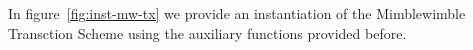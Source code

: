 \begin{center}
    \fbox{
    \begin{varwidth}{\textwidth}
        \procedure[linenumbering]{$\procCreateCoin{\varValue}{\varBlindingFactor}$} {
        \varCoin \opFunResult \procCommit{\varValue}{\varBlindingFactor} \\
        \varProof \opFunResult \procProof{\varCoin}{\varValue}{\varBlindingFactor} \\
        \pcreturn (\varCoin, \varProof)
        }
        \procedure[linenumbering]{$\procCreatePreTx{\varMsg}{\funArray{\varCoinInp}}{\funArray{\varCoinOut}}{\funArray{\varProof}}{\varSigContext}{\funArray{\varCommitment}}{\varSignature}$}{
        \pcreturn ( \\
        \varMsg \opAssign \varMsg, \\
        \varInputs \opAssign \funArray{\varCoinInp}, \\
        \varOutputs \opAssign \funArray{\varCoinOut}, \\
        \varProofs \opAssign \funArray{\varProof}, \\
        \varSigContext \opAssign \varSigContext, \\
        \varCommits \opAssign \funArray{\varCommitment}, \\
        \varSignature \opAssign \varSignature \\
        )
        }
    \end{varwidth}
    }
\end{center}

In figure~\ref{fig:inst-mw-tx} we provide an instantiation of the Mimblewimble Transction Scheme using the auxiliary functions provided before.

